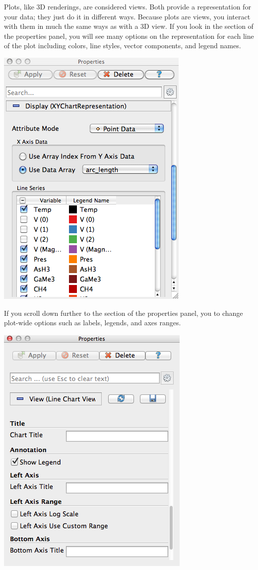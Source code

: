 Plots, like 3D renderings, are considered views.  Both provide a
representation for your data; they just do it in different ways.  Because
plots are views, you interact with them in much the same ways as with a 3D
view.  If you look in the  section of the properties panel, you
will see many options on the representation for each line of the plot
including colors, line styles, vector components, and legend names.
\begin{inlinefig}
  \includegraphics[width=.5\scw]{images/PlotDisplayTab}
\end{inlinefig}

If you scroll down further to the  section of the properties
panel, you to change plot-wide options such as labels, legends, and axes
ranges.
\begin{inlinefig}
  \includegraphics[width=.5\scw]{images/PlotViewOptions}
\end{inlinefig}

